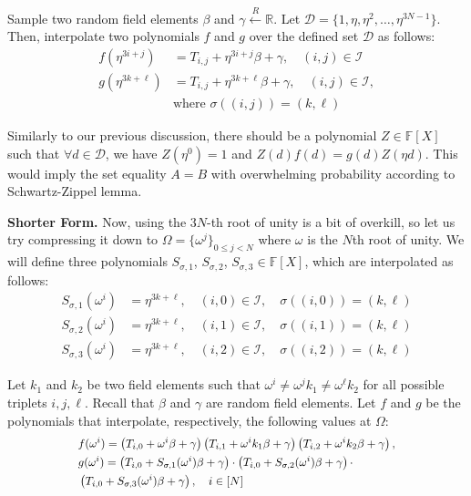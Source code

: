 \documentclass[../lecture-notes.tex]{subfiles}
\begin{document}
Sample two random field elements $\beta$ and $\gamma \xleftarrow{R} \mathbb{R}$. Let $\mathcal{D} = \{1, \eta, \eta^2, \ldots, \eta^{3N-1}\}$. Then, interpolate two polynomials $f$ and $g$ over the defined set $\mathcal{D}$ as follows:
\begin{equation*}
    \begin{aligned}
        f(\eta^{3i+j}) &= T_{i,j} + \eta^{3i+j}\beta + \gamma, \quad (i, j) \in \mathcal{I} \\
        g(\eta^{3k+\ell}) &= T_{i,j} + \eta^{3k+\ell}\beta + \gamma, \quad (i, j) \in \mathcal{I},\\
        &\text{where } \sigma((i, j)) = (k, \ell)
    \end{aligned}
\end{equation*}

Similarly to our previous discussion, there should be a polynomial $Z \in
\mathbb{F}[X]$ such that $\forall d \in \mathcal{D}$, we have $Z(\eta^{0}) = 1$ and
$Z(d)f(d) = g(d)Z(\eta d)$. This would imply the set equality $A=B$ with
overwhelming probability according to Schwartz-Zippel lemma.

\textbf{Shorter Form.} Now, using the $3N$-th root of unity is a bit of overkill,
so let us try compressing it down to $\Omega = \{\omega^j\}_{0 \leq j < N}$
where $\omega$ is the $N$th root of unity. We will define three polynomials
$S_{\sigma,1}$, $S_{\sigma,2}$, $S_{\sigma,3} \in \mathbb{F}[X]$, which are
interpolated as follows:
\begin{align*}
    S_{\sigma,1}(\omega^i) &= \eta^{3k+\ell}, \quad (i, 0) \in \mathcal{I}, \quad \sigma((i, 0)) = (k, \ell) \\
    S_{\sigma,2}(\omega^i) &= \eta^{3k+\ell}, \quad (i, 1) \in \mathcal{I}, \quad \sigma((i, 1)) = (k, \ell) \\
    S_{\sigma,3}(\omega^i) &= \eta^{3k+\ell}, \quad (i, 2) \in \mathcal{I}, \quad \sigma((i, 2)) = (k, \ell)
\end{align*}

Let $k_1$ and $k_2$ be two field elements such that $\omega^i \neq \omega^j k_1
\neq \omega^{\ell} k_2$ for all possible triplets $i, j, \ell$. Recall that
$\beta$ and $\gamma$ are random field elements. Let $f$ and $g$ be the
polynomials that interpolate, respectively, the following values at $\Omega$:
\begin{equation*}
    \scalebox{0.9}{$
    \begin{aligned}    
        &f(\omega^i) = \left(T_{i,0} + \omega^i \beta + \gamma\right)\left(T_{i,1} + \omega^i k_1 \beta + \gamma\right)\left(T_{i,2} + \omega^i k_2 \beta + \gamma\right), \\
        &g(\omega^i) = \left(T_{i,0} + S_{\sigma,1}(\omega^i) \beta + \gamma\right) \cdot \left(T_{i,0} + S_{\sigma,2}(\omega^i) \beta + \gamma\right) \cdot \\  &\left(T_{i,0} + S_{\sigma,3}(\omega^i) \beta + \gamma\right), \quad i \in [N]
    \end{aligned}
    $}
\end{equation*}
\end{document}
